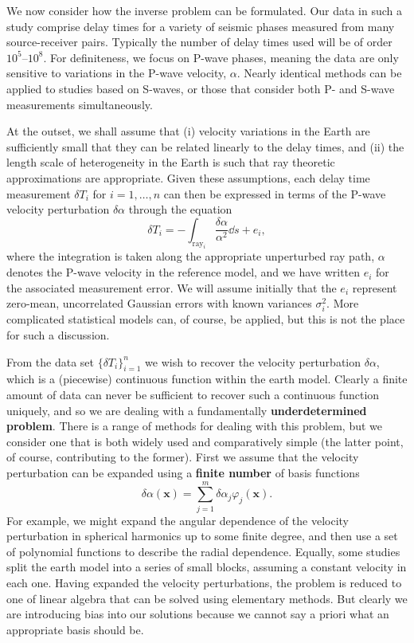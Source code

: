 We now consider how the inverse problem can be formulated. Our data in such a study comprise delay times for a variety of seismic 
phases measured from many source-receiver pairs. Typically the number of delay times used will be of order $10^{5}$--$10^{8}$. For 
definiteness, we focus on P-wave phases, meaning the data are only sensitive to variations in the P-wave velocity, $\alpha$. Nearly 
identical methods can be applied to studies based on S-waves, or those that consider both P- and S-wave measurements simultaneously.

At the outset, we shall assume that (i) velocity variations in the Earth are sufficiently small that they can be related linearly 
to the delay times, and (ii) the length scale of heterogeneity in the Earth is such that ray theoretic approximations are 
appropriate. Given these assumptions, each delay time measurement $\delta T_{i}$ for $i=1,\dots,n$ can then be expressed in terms 
of the P-wave velocity perturbation $\delta\alpha$ through the equation
\begin{equation}
    \delta T_{i} = -\int_{\mathrm{ray}_{i}} \frac{\delta\alpha}{\alpha^{2}} \dd s + e_{i},
    \label{eq:7}
\end{equation}
where the integration is taken along the appropriate unperturbed ray path, $\alpha$ denotes the P-wave velocity in the reference model, 
and we have written $e_{i}$ for the associated measurement error. We will assume initially that the $e_{i}$ represent zero-mean, 
uncorrelated Gaussian errors with known variances $\sigma_{i}^{2}$. More complicated statistical models can, of course, be applied, 
but this is not the place for such a discussion.

From the data set $\{\delta T_{i}\}_{i=1}^{n}$ we wish to recover the velocity perturbation $\delta\alpha$, which is a (piecewise) 
continuous function within the earth model. Clearly a finite amount of data can never be sufficient to recover such a continuous 
function uniquely, and so we are dealing with a fundamentally \textbf{underdetermined problem}. There is a range of methods for dealing with 
this problem, but we consider one that is both widely used and comparatively simple (the latter point, of course, contributing to the 
former). First we assume that the velocity perturbation can be expanded using a \textbf{finite number} of basis functions
\begin{equation}
    \delta\alpha(\mathbf{x}) = \sum_{j=1}^{m} \delta\alpha_{j} \varphi_{j}(\mathbf{x}).
    \label{eq:8}
\end{equation}
For example, we might expand the angular dependence of the velocity perturbation in spherical harmonics up to some finite degree, 
and then use a set of polynomial functions to describe the radial dependence. Equally, some studies split the earth model into a 
series of small blocks, assuming a constant velocity in each one. Having expanded the velocity perturbations, the problem is reduced 
to one of linear algebra that can be solved using elementary methods. But clearly we are introducing bias into our solutions because 
we cannot say a priori what an appropriate basis should be.

